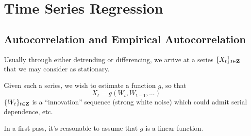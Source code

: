 \chapter{Time Series Regression}
\section{Autocorrelation and Empirical Autocorrelation}
Usually through either detrending or differencing, we arrive
at a series $ \{X_t\}_{t\in\mathbf{Z}} $ that we may consider as stationary.

Given such a series, we wish to estimate a function $ g $, so that
\[ X_t=g(W_t,W_{t-1},\ldots) \]
$ \{W_t\}_{t\in\mathbf{Z}} $ is a ``innovation'' sequence (strong white noise)
which could admit serial dependence, etc.

In a first pass, it's reasonable to assume that $ g $ is a linear function.

